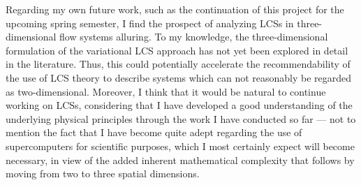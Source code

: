 

Regarding my own future work, such as the continuation of this project
for the upcoming spring semester, I find the prospect of analyzing
LCSs in three-dimensional flow systems alluring. To my knowledge, the
three-dimensional formulation of the variational LCS approach has not yet
been explored in detail in the literature. Thus, this could potentially
accelerate the recommendability of the use of LCS theory to describe systems
which can not reasonably be regarded as two-dimensional. Moreover, I think
that it would be natural to continue working on LCSs, considering that I have
developed a good understanding of the underlying physical principles through the
work I have conducted so far --- not to mention the fact that I have become
quite adept regarding the use of supercomputers for scientific purposes, which
I most certainly expect will become necessary, in view of the added inherent
mathematical complexity that follows by moving from two to three spatial
dimensions.
